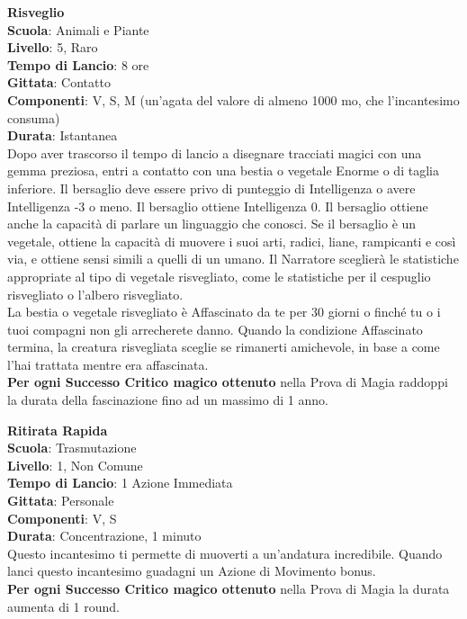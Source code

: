 \begin{multicols}{2}
\medskip\textbf{Risveglio}\\
\textbf{Scuola}: Animali e Piante\\
\textbf{Livello}: 5, Raro\\
\textbf{Tempo di Lancio}: 8 ore\\
\textbf{Gittata}: Contatto\\
\textbf{Componenti}: V, S, M (un'agata del valore di almeno 1000 mo, che l'incantesimo consuma)\\
\textbf{Durata}: Istantanea\\
Dopo aver trascorso il tempo di lancio a disegnare tracciati magici con una gemma preziosa, entri a contatto con una bestia o vegetale Enorme o di taglia inferiore. Il bersaglio deve essere privo di punteggio di Intelligenza o avere Intelligenza -3 o meno. Il bersaglio ottiene Intelligenza 0. Il bersaglio ottiene anche la capacità di parlare un linguaggio che conosci. Se il bersaglio è un vegetale, ottiene la capacità di muovere i suoi arti, radici, liane, rampicanti e così via, e ottiene sensi simili a quelli di un umano. Il Narratore sceglierà le statistiche appropriate al tipo di vegetale risvegliato, come le statistiche per il cespuglio risvegliato o l'albero risvegliato.\\
La bestia o vegetale risvegliato è Affascinato da te per 30 giorni o finché tu o i tuoi compagni non gli arrecherete danno. Quando la condizione Affascinato termina, la creatura risvegliata sceglie se rimanerti amichevole, in base a come l'hai trattata mentre era affascinata.\\
\textbf{Per ogni Successo Critico magico ottenuto} nella Prova di Magia raddoppi la durata della fascinazione fino ad un massimo di 1 anno.

\medskip\textbf{Ritirata Rapida}\\
\textbf{Scuola}: Trasmutazione\\
\textbf{Livello}: 1, Non Comune\\
\textbf{Tempo di Lancio}: 1 Azione Immediata\\
\textbf{Gittata}: Personale\\
\textbf{Componenti}: V, S\\
\textbf{Durata}: Concentrazione, 1 minuto\\
Questo incantesimo ti permette di muoverti a un'andatura incredibile. Quando lanci questo incantesimo guadagni un Azione di Movimento bonus.\\
\textbf{Per ogni Successo Critico magico ottenuto} nella Prova di Magia la durata aumenta di 1 round.


\end{multicols}
